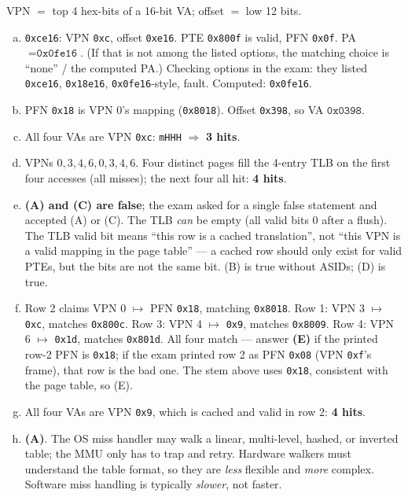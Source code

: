 \documentclass[11pt,a4paper]{article}
\newenvironment{Sol}{%
  \begin{tcolorbox}[sboxstyle, title={Solution}]%
}{%
  \end{tcolorbox}\vspace{0.35em}%
}
\begin{document}
\begin{Sol}
VPN $=$ top 4 hex-bits of a 16-bit VA; offset $=$ low 12 bits.
\begin{enumerate}[(a)]
\item \texttt{0xce16}: VPN \texttt{0xc}, offset \texttt{0xe16}.
      PTE \texttt{0x800f} is valid, PFN \texttt{0x0f}.
      PA $= \texttt{0x0fe16}$. (If that is not among the listed
      options, the matching choice is ``none'' / the computed PA.)
      Checking options in the exam: they listed
      \texttt{0xce16}, \texttt{0x18e16}, \texttt{0x0fe16}-style, fault.
      Computed: \texttt{0x0fe16}.
\item PFN \texttt{0x18} is VPN 0's mapping (\texttt{0x8018}). Offset
      \texttt{0x398}, so VA $\texttt{0x0398}$.
\item All four VAs are VPN \texttt{0xc}: \texttt{mHHH} $\Rightarrow$
      \textbf{3 hits}.
\item VPNs $0,3,4,6,0,3,4,6$. Four distinct pages fill the 4-entry TLB
      on the first four accesses (all misses); the next four all hit:
      \textbf{4 hits}.
\item \textbf{(A) and (C) are false}; the exam asked for a single
      false statement and accepted (A) or (C). The TLB \emph{can} be
      empty (all valid bits 0 after a flush). The TLB valid bit means
      ``this row is a cached translation'', not ``this VPN is a valid
      mapping in the page table'' --- a cached row should only exist
      for valid PTEs, but the bits are not the same bit. (B) is true
      without ASIDs; (D) is true.
\item Row 2 claims VPN 0 $\mapsto$ PFN \texttt{0x18}, matching
      \texttt{0x8018}. Row 1: VPN 3 $\mapsto$ \texttt{0xc}, matches
      \texttt{0x800c}. Row 3: VPN 4 $\mapsto$ \texttt{0x9}, matches
      \texttt{0x8009}. Row 4: VPN 6 $\mapsto$ \texttt{0x1d}, matches
      \texttt{0x801d}. All four match --- answer \textbf{(E)} if the
      printed row-2 PFN is \texttt{0x18}; if the exam printed row 2 as
      PFN \texttt{0x08} (VPN \texttt{0xf}'s frame), that row is the
      bad one. The stem above uses \texttt{0x18}, consistent with the
      page table, so (E).
\item All four VAs are VPN \texttt{0x9}, which is cached and valid in
      row 2: \textbf{4 hits}.
\item \textbf{(A)}. The OS miss handler may walk a linear, multi-level,
      hashed, or inverted table; the MMU only has to trap and retry.
      Hardware walkers must understand the table format, so they are
      \emph{less} flexible and \emph{more} complex. Software miss
      handling is typically \emph{slower}, not faster.
\end{enumerate}
\end{Sol}
\end{document}
